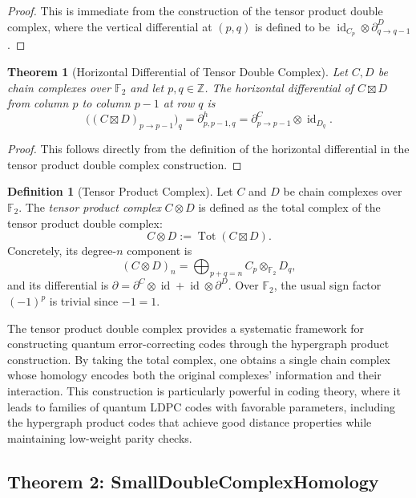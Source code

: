 \documentclass[11pt]{article}
\theoremstyle{plain}
\newtheorem*{theorem}{Theorem}
\theoremstyle{definition}
\newtheorem*{definition}{Definition}
\theoremstyle{remark}
\begin{document}
\begin{proof}
This is immediate from the construction of the tensor product double complex, where the vertical differential at $(p,q)$ is defined to be $\operatorname{id}_{C_p} \otimes \partial^D_{q \to q-1}$.
\end{proof}

\begin{theorem}[Horizontal Differential of Tensor Double Complex]
Let $C, D$ be chain complexes over $\mathbb{F}_2$ and let $p, q \in \mathbb{Z}$. The horizontal differential of $C \boxtimes D$ from column $p$ to column $p-1$ at row $q$ is
\[
\bigl((C \boxtimes D)_{p \to p-1}\bigr)_q = \partial^h_{p,p-1,q} = \partial^C_{p \to p-1} \otimes \operatorname{id}_{D_q}.
\]
\end{theorem}

\begin{proof}
This follows directly from the definition of the horizontal differential in the tensor product double complex construction.
\end{proof}

\begin{definition}[Tensor Product Complex]
Let $C$ and $D$ be chain complexes over $\mathbb{F}_2$. The \emph{tensor product complex} $C \otimes D$ is defined as the total complex of the tensor product double complex:
\[
C \otimes D := \operatorname{Tot}(C \boxtimes D).
\]
Concretely, its degree-$n$ component is
\[
(C \otimes D)_n = \bigoplus_{p + q = n} C_p \otimes_{\mathbb{F}_2} D_q,
\]
and its differential is $\partial = \partial^C \otimes \operatorname{id} + \operatorname{id} \otimes \partial^D$. Over $\mathbb{F}_2$, the usual sign factor $(-1)^p$ is trivial since $-1 = 1$.
\end{definition}

The tensor product double complex provides a systematic framework for constructing quantum error-correcting codes through the hypergraph product construction. By taking the total complex, one obtains a single chain complex whose homology encodes both the original complexes' information and their interaction. This construction is particularly powerful in coding theory, where it leads to families of quantum LDPC codes with favorable parameters, including the hypergraph product codes that achieve good distance properties while maintaining low-weight parity checks.

\vspace{1em}

\subsection{Theorem 2: SmallDoubleComplexHomology}
\end{document}
